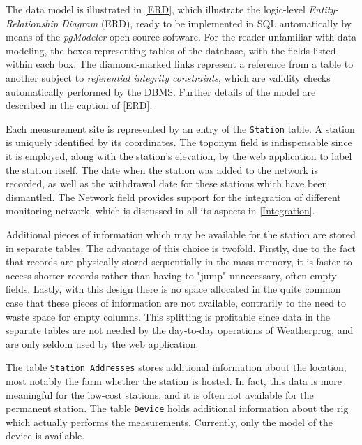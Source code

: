 \documentclass[authoryear,preprint,review,12pt]{elsarticle}
\begin{document}
The data model is illustrated in  \cref{ERD}, which illustrate the logic-level \emph{Entity-Relationship Diagram} (ERD), ready to be implemented in SQL automatically by means of the \emph{pgModeler} \citep{pgmodeler} open source software. For the reader unfamiliar with data modeling, the boxes representing tables of the database, with the fields listed within each box. The diamond-marked links represent a reference from a table to another subject to \emph{referential integrity constraints}, which are validity checks automatically performed by the DBMS. Further details of the model are described in the caption of \cref{ERD}.

Each measurement site is represented by an entry of the \texttt{Station} table. A station is uniquely identified by its coordinates. The toponym field is indispensable since it is employed, along with the station's elevation, by the web application to label the station itself. The date when the station was added to the network is recorded, as well as the withdrawal date for these stations which have been dismantled. The Network field provides support for the integration of different monitoring network, which is discussed in all its aspects in \cref{Integration}.

Additional pieces of information which may be available for the station are stored in separate tables. The advantage of this choice is twofold. Firstly, due to the fact that records are physically stored sequentially in the mass memory,  it is faster to access shorter records rather than having to "jump" unnecessary, often empty fields. Lastly, with this design there is no space allocated in the quite common case that these pieces of information are not available, contrarily to the need to waste space for empty columns. This splitting is profitable since data in the separate tables are not needed by the day-to-day operations of Weatherprog, and are only seldom used by the web application.

The table \texttt{Station Addresses} stores additional information about the location, most notably the farm whether the station is hosted. In fact, this data is more meaningful for the low-cost stations, and it is often not available for the permanent station. The table \texttt{Device} holds additional information about the rig which actually performs the measurements. Currently, only the model of the device is available.
\end{document}

